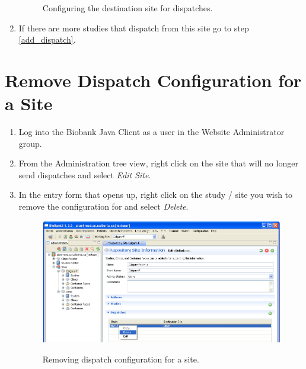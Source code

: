 \begin{enumerate}
\begin{figure}[H]
      \caption{Configuring the destination site for dispatches.}
      \label{fig:dispatch_add_config_dest_site}
    \end{figure}
  \item If there are more studies that dispatch from this site go to step \ref{add_dispatch}.
\end{enumerate}
\section{Remove Dispatch Configuration for a Site}
\label{sec:config_send_remove}
\begin{enumerate}
  \item Log into the Biobank Java Client as a user in the Website
    Administrator group.
  \item From the Administration tree view, right click on the site that will no longer send
    dispatches and select \emph{Edit Site}.
  \item In the entry form that opens up, right click on the study / site you
    wish to remove the configuration for and select \emph{Delete}.
    \begin{figure}[H]
      \centering
      \scalebox{0.5}
      { \includegraphics*{screenshots/dispatch/del_config} }
      \caption{Removing dispatch configuration for a site.}
      \label{fig:dispatch_del_config}
    \end{figure}
\end{enumerate}

